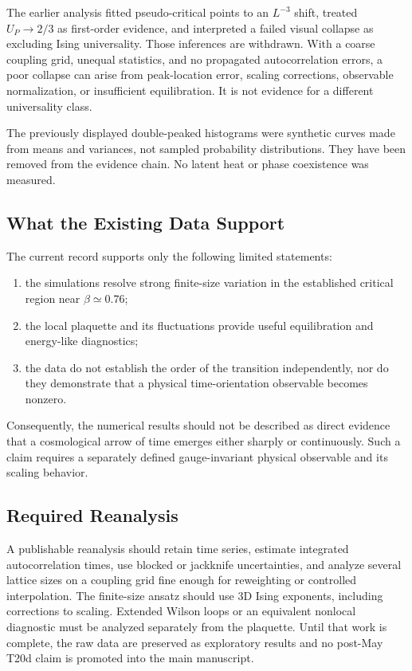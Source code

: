 The earlier analysis fitted pseudo-critical points to an $L^{-3}$ shift,
treated $U_P\to2/3$ as first-order evidence, and interpreted a failed visual
collapse as excluding Ising universality. Those inferences are withdrawn.
With a coarse coupling grid, unequal statistics, and no propagated
autocorrelation errors, a poor collapse can arise from peak-location error,
scaling corrections, observable normalization, or insufficient equilibration.
It is not evidence for a different universality class.

The previously displayed double-peaked histograms were synthetic curves made
from means and variances, not sampled probability distributions. They have
been removed from the evidence chain. No latent heat or phase coexistence was
measured.

\subsection{What the Existing Data Support}

The current record supports only the following limited statements:
\begin{enumerate}
 \item the simulations resolve strong finite-size variation in the established
       critical region near $\beta\simeq0.76$;
 \item the local plaquette and its fluctuations provide useful equilibration
       and energy-like diagnostics;
 \item the data do not establish the order of the transition independently,
       nor do they demonstrate that a physical time-orientation observable
       becomes nonzero.
\end{enumerate}

Consequently, the numerical results should not be described as direct evidence
that a cosmological arrow of time emerges either sharply or continuously. Such
a claim requires a separately defined gauge-invariant physical observable and
its scaling behavior.

\subsection{Required Reanalysis}

A publishable reanalysis should retain time series, estimate integrated
autocorrelation times, use blocked or jackknife uncertainties, and analyze
several lattice sizes on a coupling grid fine enough for reweighting or
controlled interpolation. The finite-size ansatz should use 3D Ising exponents,
including corrections to scaling. Extended Wilson loops or an equivalent
nonlocal diagnostic must be analyzed separately from the plaquette. Until that
work is complete, the raw data are preserved as exploratory results and no
post-May T20d claim is promoted into the main manuscript.
